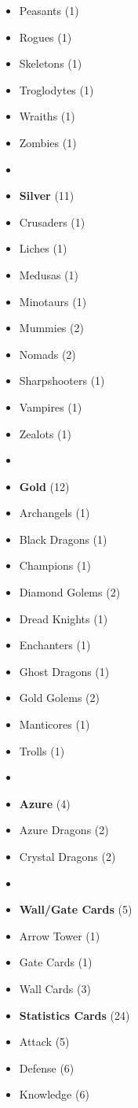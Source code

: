 \begin{multicols*}{3}
\begin{itemize}[leftmargin=0pt, label={}, noitemsep, noitemsep]
  \item Peasants (1)
  \item Rogues (1)
  \item Skeletons (1)
  \item Troglodytes (1)
  \item Wraiths (1)
  \item Zombies (1)
  \item
  \item \textbf{Silver} (11)
  \item Crusaders (1)
  \item Liches (1)
  \item Medusas (1)
  \item Minotaurs (1)
  \item Mummies (2)
  \item Nomads (2)
  \item Sharpshooters (1)
  \item Vampires (1)
  \item Zealots (1)
  \item
  \item \textbf{Gold} (12)
  \item Archangels (1)
  \item Black Dragons (1)
  \item Champions (1)
  \item Diamond Golems (2)
  \item Dread Knights (1)
  \item Enchanters (1)
  \item Ghost Dragons (1)
  \item Gold Golems (2)
  \item Manticores (1)
  \item Trolls (1)
  \item
  \item \textbf{Azure} (4)
  \item Azure Dragons (2)
  \item Crystal Dragons (2)
  \item
  \item \textbf{Wall/Gate Cards} (5)
  \item Arrow Tower (1)
  \item Gate Cards (1)
  \item Wall Cards (3)
\columnbreak
  \item \textbf{Statistics Cards} (24)
  \item Attack (5)
  \item Defense (6)
  \item Knowledge (6)

\end{itemize}
\end{multicols*}
